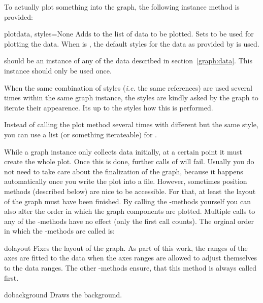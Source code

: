 To actually plot something into the graph, the following instance
method  is provided:

\begin{methoddesc}{plot}{data, styles=None}
  Adds  to the list of data to be plotted. Sets 
  to be used for plotting the data. When  is ,
  the default styles for the data as provided by  is used.

   should be an instance of any of the data described in
  section~\ref{graph:data}. This instance should only be used once.

  When the same combination of styles (\emph{i.e.} the same
  references) are used several times within the same graph instance,
  the styles are kindly asked by the graph to iterate their
  appearence. Its up to the styles how this is performed.

  Instead of calling the plot method several times with different
   but the same style, you can use a list (or something
  iterateable) for .
\end{methoddesc}

While a graph instance only collects data initially, at a certain
point it must create the whole plot. Once this is done, further calls
of  will fail. Usually you do not need to take care
about the finalization of the graph, because it happens automatically
once you write the plot into a file. However, sometimes position
methods (described below) are nice to be accessible. For that, at
least the layout of the graph must have been finished. By calling the
-methods yourself you can also alter the order in which the
graph components are plotted. Multiple calls to any of the
-methods have no effect (only the first call counts). The
orginal order in which the -methods are called is:

\begin{methoddesc}{dolayout}{}
  Fixes the layout of the graph. As part of this work, the ranges of
  the axes are fitted to the data when the axes ranges are allowed to
  adjust themselves to the data ranges. The other -methods
  ensure, that this method is always called first.
\end{methoddesc}

\begin{methoddesc}{dobackground}{}
  Draws the background.
\end{methoddesc}

